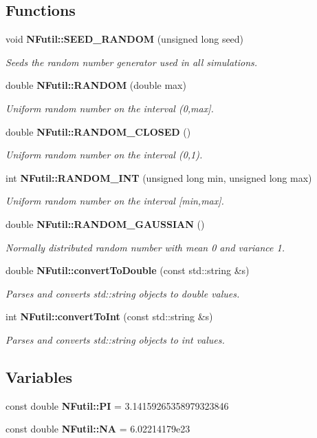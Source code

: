 \subsection*{Functions}
\begin{CompactItemize}
\item 
void {\bf NFutil::SEED\_\-RANDOM} (unsigned long seed)
\begin{CompactList}\small\item\em Seeds the random number generator used in all simulations. \item\end{CompactList}\item 
double {\bf NFutil::RANDOM} (double max)
\begin{CompactList}\small\item\em Uniform random number on the interval (0,max]. \item\end{CompactList}\item 
double {\bf NFutil::RANDOM\_\-CLOSED} ()
\begin{CompactList}\small\item\em Uniform random number on the interval (0,1). \item\end{CompactList}\item 
int {\bf NFutil::RANDOM\_\-INT} (unsigned long min, unsigned long max)
\begin{CompactList}\small\item\em Uniform random number on the interval [min,max]. \item\end{CompactList}\item 
double {\bf NFutil::RANDOM\_\-GAUSSIAN} ()
\begin{CompactList}\small\item\em Normally distributed random number with mean 0 and variance 1. \item\end{CompactList}\item 
double {\bf NFutil::convertToDouble} (const std::string \&s)
\begin{CompactList}\small\item\em Parses and converts std::string objects to double values. \item\end{CompactList}\item 
int {\bf NFutil::convertToInt} (const std::string \&s)
\begin{CompactList}\small\item\em Parses and converts std::string objects to int values. \item\end{CompactList}\end{CompactItemize}
\subsection*{Variables}
\begin{CompactItemize}
\item 
const double {\bf NFutil::PI} = 3.14159265358979323846
\item 
const double {\bf NFutil::NA} = 6.02214179e23
\end{CompactItemize}
